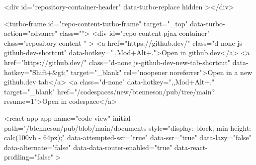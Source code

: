 {{{      








    
  <div id="repository-container-header" data-turbo-replace hidden ></div>



<turbo-frame id="repo-content-turbo-frame" target="_top" data-turbo-action="advance" class="">
    <div id="repo-content-pjax-container" class="repository-content " >
      <a href="https://github.dev/" class="d-none js-github-dev-shortcut" data-hotkey=".,Mod+Alt+.">Open in github.dev</a>
  <a href="https://github.dev/" class="d-none js-github-dev-new-tab-shortcut" data-hotkey="Shift+&gt;" target="_blank" rel="noopener noreferrer">Open in a new github.dev tab</a>
    <a class="d-none" data-hotkey=",,Mod+Alt+," target="_blank" href="/codespaces/new/btenneson/pub/tree/main?resume=1">Open in codespace</a>




    
      
    








<react-app
  app-name="code-view"
  initial-path="/btenneson/pub/blob/main/documents%
  style="display: block; min-height: calc(100vh - 64px);"
  data-attempted-ssr="true"
  data-ssr="true"
  data-lazy="false"
  data-alternate="false"
  data-data-router-enabled="true"
  data-react-profiling="false"
>
  
}}}
